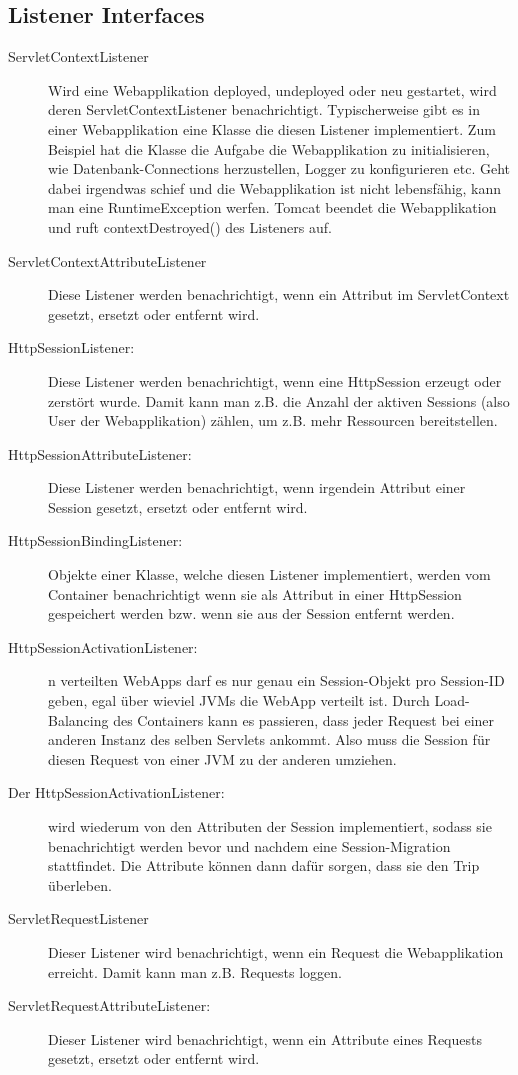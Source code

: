 \documentclass[a4paper,10pt]{scrreprt}
\begin{document}
\subsection{Listener Interfaces}
\begin{description}
 \item [ServletContextListener] Wird eine Webapplikation deployed, undeployed oder neu gestartet,
wird deren ServletContextListener benachrichtigt. Typischerweise gibt es in einer
Webapplikation eine Klasse die diesen Listener implementiert. Zum Beispiel hat die Klasse die
Aufgabe die Webapplikation zu initialisieren, wie Datenbank-Connections herzustellen, Logger zu
konfigurieren etc. Geht dabei irgendwas schief und die Webapplikation ist nicht lebensfähig, kann
man eine RuntimeException werfen. Tomcat beendet die Webapplikation und ruft
contextDestroyed() des Listeners auf.
\item [ServletContextAttributeListener] Diese Listener werden benachrichtigt, wenn ein Attribut
im ServletContext gesetzt, ersetzt oder entfernt wird.
\item [HttpSessionListener:] Diese Listener werden benachrichtigt, wenn eine HttpSession erzeugt
oder zerstört wurde. Damit kann man z.B. die Anzahl der aktiven Sessions (also User der
Webapplikation) zählen, um z.B. mehr Ressourcen bereitstellen.
\item[HttpSessionAttributeListener:] Diese Listener werden benachrichtigt, wenn irgendein
Attribut einer Session gesetzt, ersetzt oder entfernt wird.
\item[HttpSessionBindingListener:] Objekte einer Klasse, welche diesen Listener implementiert,
werden vom Container benachrichtigt wenn sie als Attribut in einer HttpSession gespeichert werden
bzw. wenn sie aus der Session entfernt werden.
\item [HttpSessionActivationListener:] n verteilten WebApps darf es nur genau ein Session-Objekt
pro Session-ID geben, egal über wieviel JVMs die WebApp verteilt ist. Durch Load-Balancing des
Containers kann es passieren, dass jeder Request bei einer anderen Instanz des selben Servlets
ankommt. Also muss die Session für diesen Request von einer JVM zu der anderen umziehen.
\item[Der HttpSessionActivationListener:] wird wiederum von den Attributen der Session
implementiert, sodass sie benachrichtigt werden bevor und nachdem eine Session-Migration
stattfindet. Die Attribute können dann dafür sorgen, dass sie den Trip überleben.
\item[ServletRequestListener] Dieser Listener wird benachrichtigt, wenn ein Request die
Webapplikation erreicht. Damit kann man z.B. Requests loggen.
\item[ServletRequestAttributeListener:]Dieser Listener wird benachrichtigt, wenn ein Attribute
eines Requests gesetzt, ersetzt oder entfernt wird.
\end{description}
\end{document}
